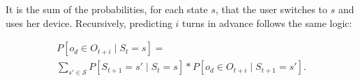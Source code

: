 It is the sum of the probabilities, for each state $s$, that the user switches to $s$ and uses her device.
Recursively, predicting $i$ turns in advance follows the same logic:

\begin{multline*}
P\left[ o_d \in O_{t+i} \mid S_{t} = s \right] = \\
\sum\limits_{s' \in \mathcal{S}}
P\left[ S_{t+1} = s' \mid S_t = s \right] * 
P\left[ o_d \in O_{t+i} \mid S_{t+1} = s'\right].
\end{multline*}



